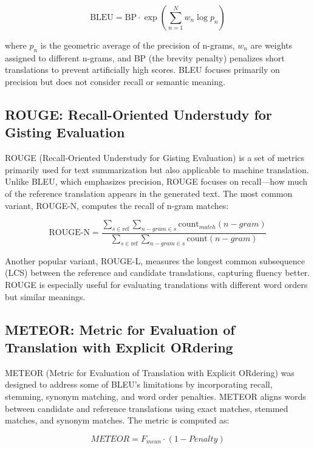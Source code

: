 \begin{equation}
\text{BLEU} = \text{BP} \cdot \exp\left(\sum_{n=1}^{N} w_n \log p_n \right)
\end{equation}

where  $p_n$ is the geometric average of the precision of n-grams,  $w_n$ are weights assigned to different n-grams, and  $\text{BP}$ (the brevity penalty) penalizes short translations to prevent artificially high scores. BLEU focuses primarily on precision but does not consider recall or semantic meaning.

\subsection{ROUGE: Recall-Oriented Understudy for Gisting Evaluation}%
ROUGE (Recall-Oriented Understudy for Gisting Evaluation) \cite{linROUGEPackageAutomatic2004} is a set of metrics primarily used for text summarization but also applicable to machine translation. Unlike BLEU, which emphasizes precision, ROUGE focuses on recall—how much of the reference translation appears in the generated text. The most common variant, ROUGE-N, computes the recall of n-gram matches:

\begin{equation}
\text{ROUGE-N} = \frac{\sum_{s \in \text{ref}} \sum_{n-gram \in s} \text{count}_{match}(n-gram)}{\sum_{s \in \text{ref}} \sum_{n-gram \in s} \text{count}(n-gram)}
\end{equation}

Another popular variant, ROUGE-L, measures the longest common subsequence (LCS) between the reference and candidate translations, capturing fluency better. ROUGE is especially useful for evaluating translations with different word orders but similar meanings.

\subsection{METEOR: Metric for Evaluation of Translation with Explicit ORdering}%
METEOR (Metric for Evaluation of Translation with Explicit ORdering) was designed to address some of BLEU's limitations by incorporating recall, stemming, synonym matching, and word order penalties. METEOR aligns words between candidate and reference translations using exact matches, stemmed matches, and synonym matches. The metric is computed as:

\begin{equation}
METEOR = F_{mean} \cdot (1 - Penalty)
\end{equation}

